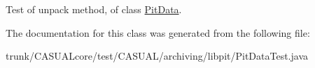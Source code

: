 Test of unpack method, of class \hyperlink{classCASUAL_1_1archiving_1_1libpit_1_1PitData}{Pit\-Data}. 

The documentation for this class was generated from the following file\-:\begin{DoxyCompactItemize}
\item 
trunk/\-C\-A\-S\-U\-A\-Lcore/test/\-C\-A\-S\-U\-A\-L/archiving/libpit/Pit\-Data\-Test.\-java\end{DoxyCompactItemize}
